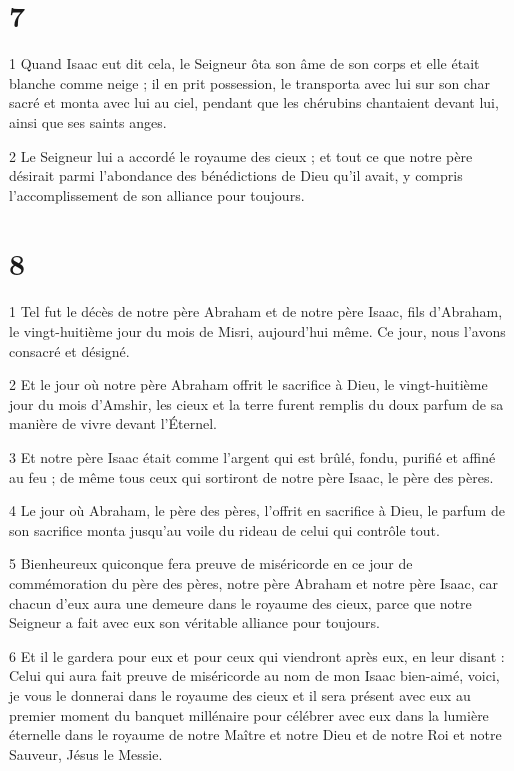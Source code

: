 \chapter{7}

\par 1 Quand Isaac eut dit cela, le Seigneur ôta son âme de son corps et elle était blanche comme neige ; il en prit possession, le transporta avec lui sur son char sacré et monta avec lui au ciel, pendant que les chérubins chantaient devant lui, ainsi que ses saints anges.

\par 2 Le Seigneur lui a accordé le royaume des cieux ; et tout ce que notre père désirait parmi l'abondance des bénédictions de Dieu qu'il avait, y compris l'accomplissement de son alliance pour toujours.

\chapter{8}

\par 1 Tel fut le décès de notre père Abraham et de notre père Isaac, fils d'Abraham, le vingt-huitième jour du mois de Misri, aujourd'hui même. Ce jour, nous l'avons consacré et désigné.

\par 2 Et le jour où notre père Abraham offrit le sacrifice à Dieu, le vingt-huitième jour du mois d'Amshir, les cieux et la terre furent remplis du doux parfum de sa manière de vivre devant l'Éternel.

\par 3 Et notre père Isaac était comme l'argent qui est brûlé, fondu, purifié et affiné au feu ; de même tous ceux qui sortiront de notre père Isaac, le père des pères.

\par 4 Le jour où Abraham, le père des pères, l'offrit en sacrifice à Dieu, le parfum de son sacrifice monta jusqu'au voile du rideau de celui qui contrôle tout.

\par 5 Bienheureux quiconque fera preuve de miséricorde en ce jour de commémoration du père des pères, notre père Abraham et notre père Isaac, car chacun d'eux aura une demeure dans le royaume des cieux, parce que notre Seigneur a fait avec eux son véritable alliance pour toujours.

\par 6 Et il le gardera pour eux et pour ceux qui viendront après eux, en leur disant : Celui qui aura fait preuve de miséricorde au nom de mon Isaac bien-aimé, voici, je vous le donnerai dans le royaume des cieux et il sera présent avec eux au premier moment du banquet millénaire pour célébrer avec eux dans la lumière éternelle dans le royaume de notre Maître et notre Dieu et de notre Roi et notre Sauveur, Jésus le Messie.

